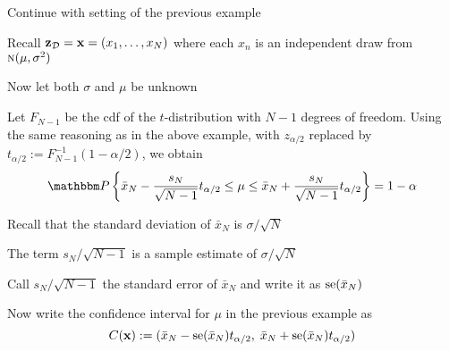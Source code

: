 \begin{frame}

    \vspace{2em}
    \Eg
    Continue with setting of the previous example
    
    Recall $\mathbf{z}_{\mathcal D} = {\mathbf x} = (x_1,\ldots,x_N)$ where each $x_n$ is an
    independent draw from $\textrm{\sc n}(\mu, \sigma^2)$
    
    Now let both $\sigma$ and $\mu$ be unknown 
    
    \vspace{.7em}
    Let $F_{N-1}$ be the {\sc cdf} of the $t$-distribution with
    $N-1$ degrees of freedom.  Using the same reasoning as in the
    above example, with $z_{\alpha/2}$ replaced by $t_{\alpha/2} :=
    F^{-1}_{N-1}(1 - \alpha/2)$, we obtain
    \begin{equation*}
        \PP 
            \left\{ 
            \bar x_N - 
                \frac{s_N}{\sqrt{N-1}} t_{\alpha/2}
            \leq \mu \leq 
            \bar x_N + 
                \frac{s_N}{\sqrt{N-1}} t_{\alpha/2}
            \right\}
        = 1 - \alpha
    \end{equation*}
    
\end{frame}

\begin{frame}
    
    \vspace{2em}
    Recall that the standard deviation of $\bar x_N$ is $\sigma/ \sqrt{N}$
    
    The term $s_N/\sqrt{N-1}$ is a sample estimate of $\sigma/ \sqrt{N}$
    
    Call $s_N/\sqrt{N-1}$ 
    the standard error of
    $\bar x_N$ and write it as $\operatorname{se}(\bar x_N)$
    
    \vspace{.7em}
    Now write the confidence
    interval for $\mu$ in the previous example as
    \begin{equation}
        \label{eq:citc}
        C({\mathbf x}) := (\bar x_N - \operatorname{se}(\bar x_N) t_{\alpha/2},\;
             \bar x_N + \operatorname{se}(\bar x_N) t_{\alpha/2})
    \end{equation}


\end{frame}

